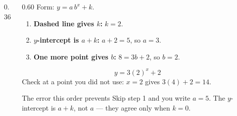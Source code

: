 \documentclass[aspectratio=169, 11pt]{beamer}
\newcommand{\lgrid}[4]{%
  \draw[step=1, linegray!45, thin] (#1,#3) grid (#2,#4);
  \draw[->, thick, charcoal] (#1,0)--(#2,0) node[below right, font=\tiny]{$x$};
  \draw[->, thick, charcoal] (0,#3)--(0,#4) node[left, font=\tiny]{$y$};}
\newcommand{\expgraph}[6]{\draw[very thick, forest, domain=#5:#6, samples=140, smooth]
  plot (\x,{(#1)*exp((#2)*((\x)-(#3)))+(#4)});}
\newcommand{\hasym}[3]{\draw[navy, dashed, thick] (#1,#3)--(#2,#3);}
\begin{document}
\begin{frame}[t, plain]
  \begin{columns}[T]
    \begin{column}{0.36\textwidth}
      \centering
    \end{column}
    \begin{column}{0.60\textwidth}
      \footnotesize
      Form: $y=a\,b^{x}+k$.
      \begin{enumerate}\setlength{\itemsep}{4pt}
        \item \textbf{Dashed line gives $k$:} \; $k=2$.
        \item \textbf{$y$-intercept is $a+k$:} \; $a+2=5$, so $a=3$.
        \item \textbf{One more point gives $b$:} \; $8=3b+2$, so $b=2$.
      \end{enumerate}
      \vspace{3pt}
      \[ y = 3(2)^{x}+2 \]
      Check at a point you did not use: $x=2$ gives $3(4)+2=14$. \\[4pt]
      \begin{block}{The error this order prevents}
        Skip step 1 and you write $a=5$. The $y$-intercept is $a+k$, not $a$ --- they agree only when
        $k=0$.
      \end{block}
    \end{column}
  \end{columns}
\end{frame}
\end{document}
